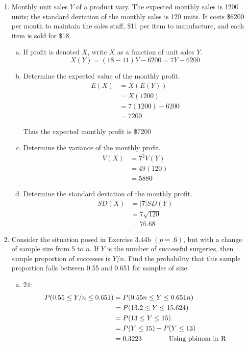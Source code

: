 \documentclass{scrartcl}
\begin{document}
\begin{enumerate}
\item Monthly unit sales $Y$ of a product vary. The expected monthly sales is 1200 units; the standard deviation of the monthly sales is 120 units. It costs \$6200 per month to maintain the sales staff, \$11 per item to manufacture, and each item is sold for \$18.

\begin{enumerate}[a)]
\item If profit is denoted $X$, write $X$ as a function of unit sales $Y$.\\
$$X(Y) = (18 - 11)Y - 6200 = 7Y - 6200$$

\item Determine the expected value of the monthly profit.\\
\begin{align*}
  E(X) &= X(E(Y))\\
       &= X(1200)\\
       &= 7(1200) - 6200\\
       &= 7200
\end{align*}

Thus the expected monthly profit is \$7200

\item Determine the variance of the monthly profit.\\
\begin{align*}
  V(X) &= 7^2V(Y)\\
       &= 49(120)\\
       &= 5880
\end{align*}

\item Determine the standard deviation of the monthly profit.\\
\begin{align*}
  SD(X) &= |7|SD(Y)\\
       &= 7\sqrt{120}\\
       &= 76.68
\end{align*}
\end{enumerate}

\item Consider the situation posed in Exercise 3.44b $(p=.6)$, but with a change of sample size from 5 to $n$. If $Y$ is the number of successful surgeries, then sample proportion of successes is $Y/n$. Find the probability that this sample proportion falls between 0.55 and 0.651 for samples of size:

\begin{enumerate}[a)]
\item 24:\\
\begin{align*}
  P(0.55\le Y/n\le0.651) &= P(0.55n\le Y \le0.651n)\\
  &= P(13.2\le Y\le 15.624)\\
  &= P(13\le Y \le15)\\
  &= P(Y\le15) - P(Y\le13)\\
  &= 0.3223 \text{\hspace{0.5in} Using pbinom in R}
\end{align*}


\end{enumerate}
\end{enumerate}
\end{document}
